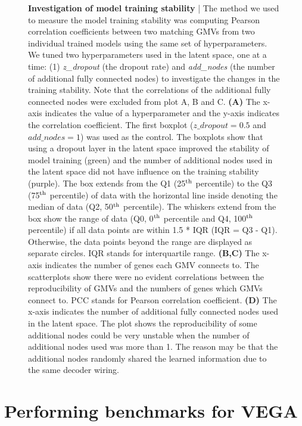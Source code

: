 \addtocounter{figure}{-1}
\begin{figure}[t!]
    \caption{\small{\textbf{Investigation of model training stability} | The method we used to measure the model training stability was computing Pearson correlation coefficients between two matching GMVs from two individual trained models using the same set of hyperparameters. We tuned two hyperparameters used in the latent space, one at a time: (1) \textit{z\_dropout} (the dropout rate) and \textit{add\_nodes} (the number of additional fully connected nodes) to investigate the changes in the training stability. Note that the correlations of the additional fully connected nodes were excluded from plot A, B and C. \textbf{(A)} The x-axis indicates the value of a hyperparameter and the y-axis indicates the correlation coefficient. The first boxplot ($z\_dropout=0.5$ and $add\_nodes=1$) was used as the control. The boxplots show that using a dropout layer in the latent space improved the stability of model training (green) and the number of additional nodes used in the latent space did not have influence on the training stability (purple). The box extends from the Q1 (25$\textsuperscript{th}$ percentile) to the Q3 (75$\textsuperscript{th}$ percentile) of data with the horizontal line inside denoting the median of data (Q2, 50$\textsuperscript{th}$ percentile). The whiskers extend from the box show the range of data (Q0, 0$\textsuperscript{th}$ percentile and Q4, 100$\textsuperscript{th}$ percentile) if all data points are within 1.5 * IQR (IQR = Q3 - Q1). Otherwise, the data points beyond the range are displayed as separate circles. IQR stands for interquartile range. \textbf{(B,C)} The x-axis indicates the number of genes each GMV connects to. The scatterplots show there were no evident correlations between the reproducibility of GMVs and the numbers of genes which GMVs connect to. PCC stands for Pearson correlation coefficient. \textbf{(D)} The x-axis indicates the number of additional fully connected nodes used in the latent space. The plot shows the reproducibility of some additional nodes could be very unstable when the number of additional nodes used was more than 1. The reason may be that the additional nodes randomly shared the learned information due to the same decoder wiring.}}
\end{figure}

\section{Performing benchmarks for VEGA}\label{results:benchmarks}
